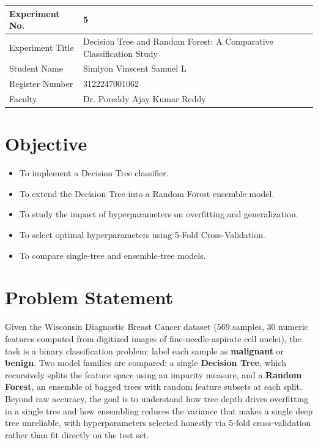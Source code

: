 \documentclass[12pt,a4paper]{article}
\begin{document}
\begin{tabular}{|p{4cm}|p{11cm}|}
\hline
Experiment No. & 5 \\ \hline
Experiment Title & Decision Tree and Random Forest: A Comparative Classification
Study\footnotemark\\ \hline
Student Name & Simiyon Vinscent Samuel L \\ \hline
Register Number & 3122247001062 \\ \hline
Faculty & Dr. Poreddy Ajay Kumar Reddy \\ \hline
\end{tabular}

\section{Objective}
\begin{itemize}[nosep]
\item To implement a Decision Tree classifier.
\item To extend the Decision Tree into a Random Forest ensemble model.
\item To study the impact of hyperparameters on overfitting and generalization.
\item To select optimal hyperparameters using 5-Fold Cross-Validation.
\item To compare single-tree and ensemble-tree models.
\end{itemize}

\section{Problem Statement}
Given the Wisconsin Diagnostic Breast Cancer dataset (569 samples, 30 numeric features
computed from digitized images of fine-needle-aspirate cell nuclei), the task is a binary
classification problem: label each sample as \textbf{malignant} or \textbf{benign}. Two
model families are compared: a single \textbf{Decision Tree}, which recursively splits
the feature space using an impurity measure, and a \textbf{Random Forest}, an ensemble of
bagged trees with random feature subsets at each split. Beyond raw accuracy, the goal is
to understand how tree depth drives overfitting in a single tree and how ensembling
reduces the variance that makes a single deep tree unreliable, with hyperparameters
selected honestly via 5-fold cross-validation rather than fit directly on the test set.
\end{document}
